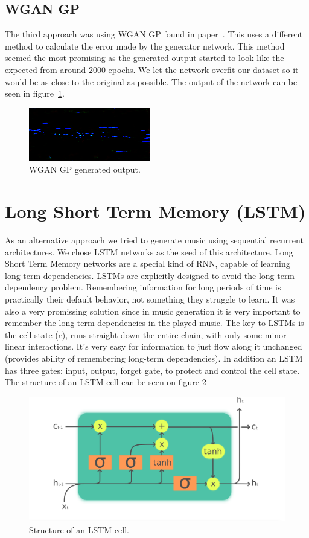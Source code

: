 \documentclass{article}
\begin{document}
\subsection{WGAN GP}
The third approach was using WGAN GP found in paper~\cite{wgangpg}. This uses a different method to calculate the error made by the generator network. This method seemed the most promising as the generated output started to look like the expected from around 2000 epochs. We let the network overfit our dataset so it would be as close to the original as possible. The output of the network can be seen in figure~\ref{fig:wgangp}.
\begin{figure}[!htb]
	\centering
	\includegraphics[width=0.7\linewidth]{wgangp.png}
	\caption{WGAN GP generated output.}
	\label{fig:wgangp}
\end{figure}

\section{Long Short Term Memory (LSTM)}

As an alternative approach we tried to generate music using sequential recurrent architectures. We chose LSTM networks as the seed of this architecture. Long Short Term Memory networks are a special kind of RNN, capable of learning long-term dependencies. 
LSTMs are explicitly designed to avoid the long-term dependency problem. Remembering information for long periods of time is practically their default behavior, not something they struggle to learn. It was also a very promissing solution since in music generation it is very important to remember the long-term dependencies in the played music. The key to LSTMs is the cell state ($c$), runs straight down the entire chain, with only some minor linear interactions. It’s very easy for information to just flow along it unchanged (provides ability of remembering long-term dependencies). In addition an LSTM has three gates: input, output, forget gate, to protect and control the cell state. The structure of an LSTM cell can be seen on figure \ref{fig:lstmcell}

\begin{figure}[!htb]
	\centering
	\includegraphics[width=0.7\linewidth]{LSTMcell.png}
	\caption{Structure of an LSTM cell.}
	\label{fig:lstmcell}
\end{figure}
\end{document}
